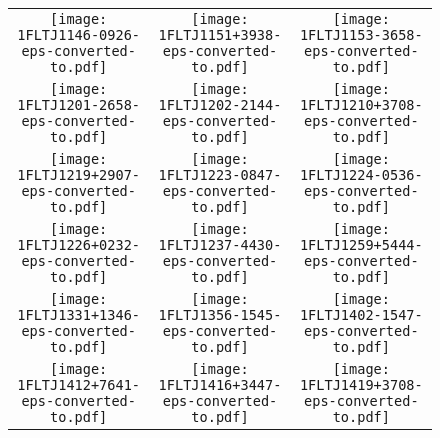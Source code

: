 \begin{figure}[!t]
	\centering            
	\ContinuedFloat
\setlength\tabcolsep{0.0pt}
\begin{tabular}{ccc}
  \texttt{[image: 1FLTJ1146-0926-eps-converted-to.pdf]}\label{fig:1FLTJ1146-0926}&
  \texttt{[image: 1FLTJ1151+3938-eps-converted-to.pdf]}\label{fig:1FLTJ1151+3938}&
  \texttt{[image: 1FLTJ1153-3658-eps-converted-to.pdf]}\label{fig:1FLTJ1153-3658}\\
  \texttt{[image: 1FLTJ1201-2658-eps-converted-to.pdf]}\label{fig:1FLTJ1201-2658}&
  \texttt{[image: 1FLTJ1202-2144-eps-converted-to.pdf]}\label{fig:1FLTJ1202-2144}&
  \texttt{[image: 1FLTJ1210+3708-eps-converted-to.pdf]}\label{fig:1FLTJ1210+3708}\\
  \texttt{[image: 1FLTJ1219+2907-eps-converted-to.pdf]}\label{fig:1FLTJ1219+2907}&
  \texttt{[image: 1FLTJ1223-0847-eps-converted-to.pdf]}\label{fig:1FLTJ1223-0847}&
  \texttt{[image: 1FLTJ1224-0536-eps-converted-to.pdf]}\label{fig:1FLTJ1224-0536}\\
  \texttt{[image: 1FLTJ1226+0232-eps-converted-to.pdf]}\label{fig:1FLTJ1226+0232}&
  \texttt{[image: 1FLTJ1237-4430-eps-converted-to.pdf]}\label{fig:1FLTJ1237-4430}&
  \texttt{[image: 1FLTJ1259+5444-eps-converted-to.pdf]}\label{fig:1FLTJ1259+5444}\\
  \texttt{[image: 1FLTJ1331+1346-eps-converted-to.pdf]}\label{fig:1FLTJ1331+1346}&
  \texttt{[image: 1FLTJ1356-1545-eps-converted-to.pdf]}\label{fig:1FLTJ1356-1545}&
  \texttt{[image: 1FLTJ1402-1547-eps-converted-to.pdf]}\label{fig:1FLTJ1402-1547}\\
  \texttt{[image: 1FLTJ1412+7641-eps-converted-to.pdf]}\label{fig:1FLTJ1412+7641}&
  \texttt{[image: 1FLTJ1416+3447-eps-converted-to.pdf]}\label{fig:1FLTJ1416+3447}&
  \texttt{[image: 1FLTJ1419+3708-eps-converted-to.pdf]}\label{fig:1FLTJ1419+3708}\\
\end{tabular}
\end{figure}
